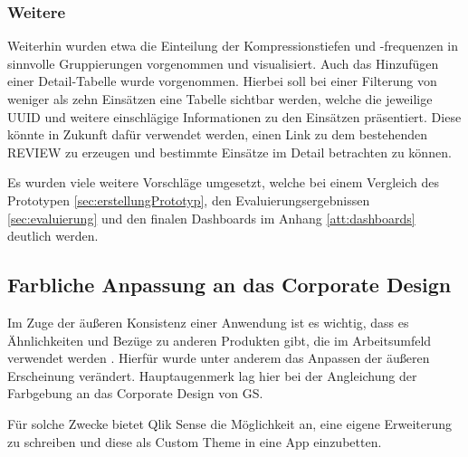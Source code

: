 \subsubsection{Weitere}
Weiterhin wurden etwa die Einteilung der Kompressionstiefen und -frequenzen in sinnvolle Gruppierungen vorgenommen und visualisiert.
\label{par:DetailTabelle}
Auch das Hinzufügen einer \glqq Detail-Tabelle\grqq{} wurde vorgenommen.
Hierbei soll bei einer Filterung von weniger als zehn Einsätzen eine Tabelle sichtbar werden, welche die jeweilige UUID und weitere einschlägige Informationen zu den Einsätzen präsentiert.
Diese könnte in Zukunft dafür verwendet werden, einen Link zu dem bestehenden \gls{REVIEW} zu erzeugen und bestimmte Einsätze im Detail betrachten zu können.

Es wurden viele weitere Vorschläge umgesetzt, welche bei einem Vergleich des Prototypen \ref{sec:erstellungPrototyp}, den Evaluierungsergebnissen \ref{sec:evaluierung} und den finalen Dashboards im Anhang \ref{att:dashboards} deutlich werden.

\subsection{Farbliche Anpassung an das Corporate Design}
Im Zuge der äußeren Konsistenz einer Anwendung ist es wichtig, dass es Ähnlichkeiten und Bezüge zu anderen Produkten gibt, die im Arbeitsumfeld verwendet werden \cite{Christoforakos.2017, Abele.2007}.
Hierfür wurde unter anderem das Anpassen der äußeren Erscheinung verändert.
Hauptaugenmerk lag hier bei der Angleichung der Farbgebung an das Corporate Design von \gls{GS}.

Für solche Zwecke bietet Qlik Sense die Möglichkeit an, eine eigene Erweiterung zu schreiben und diese als \glqq Custom Theme\grqq{} in eine App einzubetten.


